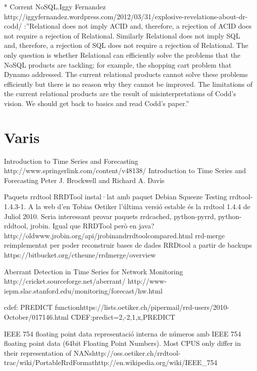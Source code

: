 * Corrent NoSQL.Iggy Fernandez http://iggyfernandez.wordpress.com/2012/03/31/explosive-revelations-about-dr-codd/ :''Relational does not imply ACID and, therefore, a rejection of ACID does not require a rejection of Relational. Similarly Relational does not imply SQL and, therefore, a rejection of SQL does not require a rejection of Relational. The only question is whether Relational can efficiently solve the problems that the NoSQL products are tackling; for example, the shopping cart problem that Dynamo addressed. The current relational products cannot solve these problems efficiently but there is no reason why they cannot be improved. The limitations of the current relational products are the result of misinterpretations of Codd’s vision. We should get back to basics and read Codd’s paper.''




\section{Varis}

Introduction to Time Series and Forecasting
​http://www.springerlink.com/content/v48138/
Introduction to Time Series and Forecasting 
Peter J. Brockwell and Richard A. Davis



Paquets rrdtool
RRDTool instal·lat amb paquet Debian Squeeze Testing rrdtool-1.4.3-1. A la web d'en Tobias Oetiker l'última versió estable és la rrdtool 1.4.4 de Juliol 2010.
Seria interessant provar paquets rrdcached, python-pyrrd, python-rddtool, 
jrobin. Igual que RRDTool però en java?
​http://oldwww.jrobin.org/api/jrobinandrrdtoolcompared.html
rrd-merge reimplementat per poder reconstruir bases de dades RRDtool a partir de backups
​https://bitbucket.org/ctheune/rrdmerge/overview



Aberrant Detection in Time Series for Network Monitoring
​http://cricket.sourceforge.net/aberrant/
http://www-iepm.slac.stanford.edu/monitoring/forecast/hw.html


cdef: PREDICT function
​https://lists.oetiker.ch/pipermail/rrd-users/2010-October/017146.html
CDEF:predict=2,-2,1,x,PREDICT


IEEE 754 floating point data
representació interna de números amb IEEE 754 floating point data (64bit Floating Point Numbers). Most CPUS only differ in their representation of NANs
​http://oss.oetiker.ch/rrdtool-trac/wiki/PortableRrdFormat
​http://en.wikipedia.org/wiki/IEEE_754

